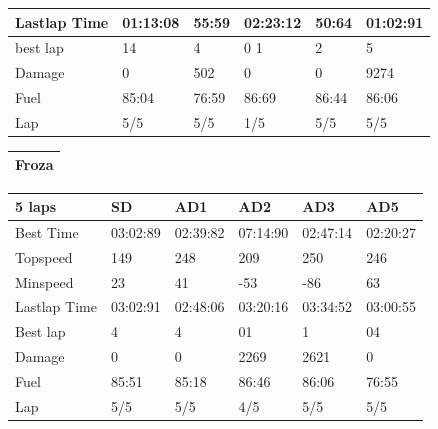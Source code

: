 \documentclass{llncs}
\begin{document}
\begin{table} [h!]
\begin{tabular}{ |p{3cm}|p{2cm}|p{2cm}|p{2 cm}|p{2 cm}|p{2 cm}|}
		
		Lastlap	Time  & 01:13:08  & 55:59 & 02:23:12 & 50:64 & 01:02:91 
		\\
		\hline 
		best lap & 14 & 4 & 0 1& 2 & 5 
		\\
		\hline
		Damage &  0 & 502 & 0 & 0 & 9274 
		\\
		\hline 
		Fuel & 85:04 & 76:59 &86:69& 86:44& 86:06 
		\\
		\hline
		Lap & 5/5 & 5/5 & 1/5 & 5/5 & 5/5
		\\
		\hline		
	\end{tabular}
	\begin{tabular}{ |p{15.2cm}|}
		\hline
		\textbf{Froza}   
		\\
		\hline
	\end{tabular}
	
	
	\begin{tabular}{ |p{3cm}|p{2cm}|p{2cm}|p{2 cm}|p{2 cm}|p{2 cm}|}
		\hline
		{ \color{blue}\textbf{5 laps} }&
		{ \color{red}\textbf{SD}}&  
		{ \color{red} \textbf{AD1} } &
		{ \color{red} \textbf{AD2} } &
		{ \color{red} \textbf{AD3} } &
		{ \color{red} \textbf{AD5} }
		\\
		\hline
		Best Time & 03:02:89 & 02:39:82 & 07:14:90  & 02:47:14  & 02:20:27 
		\\
		\hline
		Topspeed & 149 & 248 & 209 & 250 & 246 
		\\
		\hline
		Minspeed & 23  & 41 & -53 & -86 & 63 
		\\
		\hline 
		
		
		Lastlap	Time  & 03:02:91 & 02:48:06 & 03:20:16 & 03:34:52 & 03:00:55
		\\
		\hline 
		Best lap & 4 & 4 & 01 & 1 & 04 
		\\
		\hline
		Damage & 0 & 0 & 2269 &2621 & 0 
		\\
		\hline 
		Fuel & 85:51 & 85:18 & 86:46 & 86:06 & 76:55
		\\
		\hline 
		Lap & 5/5 & 5/5 & 4/5 & 5/5 & 5/5
		\\
		\hline	
	\end{tabular}
\end{table}
\newpage
\end{document}
